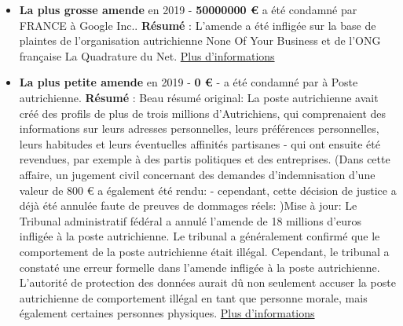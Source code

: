 \documentclass[french]{article}
\begin{document}
\newpage
\justify
	\begin{multicols}{2}
		\begin{itemize}
			\item \textbf{La plus grosse amende} en 2019 - \textbf{50000000 €} a été condamné par FRANCE à Google Inc..
			\newline
			\textbf{Résumé} : L'amende a été infligée sur la base de plaintes de l'organisation autrichienne None Of Your Business et de l'ONG française La Quadrature du Net.
			\newline
			\href{https://www.cnil.fr/en/cnils-restricted-committee-imposes-financial-penalty-50-million-euros-against-google-llc}{Plus d'informations}
			\vspace{1cm}
		
			\item \textbf{La plus petite amende} en 2019 - \textbf{0 €} -  a été condamné par  à Poste autrichienne.
			\newline
			\textbf{Résumé} : Beau résumé original: La poste autrichienne avait créé des profils de plus de trois millions d'Autrichiens, qui comprenaient des informations sur leurs adresses personnelles, leurs préférences personnelles, leurs habitudes et leurs éventuelles affinités partisanes - qui ont ensuite été revendues, par exemple à des partis politiques et des entreprises. (Dans cette affaire, un jugement civil concernant des demandes d'indemnisation d'une valeur de 800 € a également été rendu: - cependant, cette décision de justice a déjà été annulée faute de preuves de dommages réels: )Mise à jour: Le Tribunal administratif fédéral a annulé l'amende de 18 millions d'euros infligée à la poste autrichienne. Le tribunal a généralement confirmé que le comportement de la poste autrichienne était illégal. Cependant, le tribunal a constaté une erreur formelle dans l'amende infligée à la poste autrichienne. L'autorité de protection des données aurait dû non seulement accuser la poste autrichienne de comportement illégal en tant que personne morale, mais également certaines personnes physiques.
			\newline
			\href{https://wien.orf.at/stories/3019396/}{Plus d'informations}
		\end{itemize}
	\end{multicols}


\newpage
\end{document}
